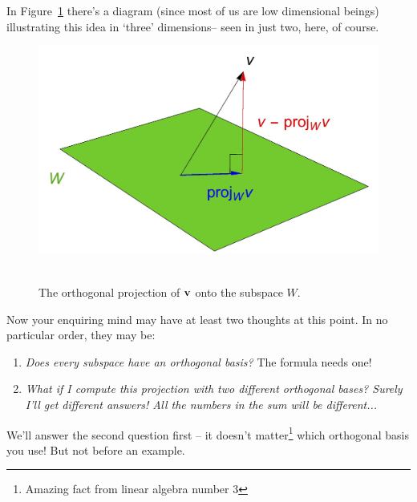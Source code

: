 In Figure~\ref{figure:othogproj} there's a diagram (since most of us are low dimensional beings) illustrating this idea in `three' dimensions-- seen in just two, here, of course.
\begin{figure}
\begin{center}
\includegraphics[scale=.2] {img/projW.jpg}~\\[1cm]
\end{center} 
\vglue-1cm
\caption{The orthogonal projection of $\mathbf{v}$ onto the subspace $W$.}\label{figure:othogproj}
\end{figure}

Now your enquiring mind  may have at least two thoughts at this point. In no particular order, they may be:
\begin{enumerate}

\item {\it Does every subspace have an orthogonal basis?} The formula needs one!\label{goodquestion1}

\item {\it What if I compute this projection with two different orthogonal bases? Surely I'll get  different answers! All the numbers in the sum will be different...}
\end{enumerate}
 
\medskip

We'll answer the second question first -- it doesn't matter\footnote{Amazing fact from linear algebra number 3} which orthogonal basis you use! But not before an example.



